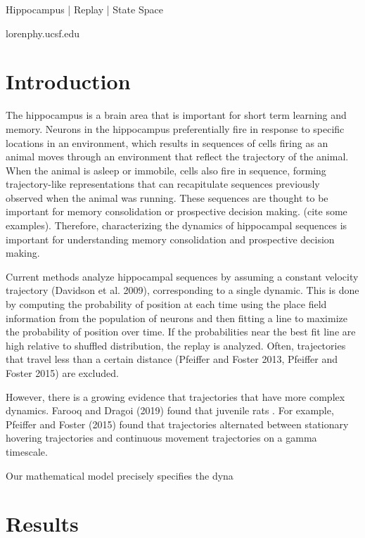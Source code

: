 \documentclass[times, twoside, watermark]{zHenriquesLab-StyleBioRxiv}
\begin{document}
\begin{keywords}
Hippocampus | Replay | State Space
\end{keywords}

\begin{corrauthor}
loren\at phy.ucsf.edu
\end{corrauthor}

\section*{Introduction}
The hippocampus is a brain area that is important for short term learning and memory. Neurons in the hippocampus preferentially fire in response to specific locations in an environment, which results in sequences of cells firing as an animal moves through an environment that reflect the trajectory of the animal. When the animal is asleep or immobile, cells also fire in sequence, forming trajectory-like representations that can recapitulate sequences previously observed when the animal was running. These sequences are thought to be important for memory consolidation or prospective decision making. (cite some examples). Therefore, characterizing the dynamics of hippocampal sequences is important for understanding memory consolidation and prospective decision making.

Current methods analyze hippocampal sequences by assuming a constant velocity trajectory (Davidson et al. 2009), corresponding to a single dynamic. This is done by computing the probability of position at each time using the place field information from the population of neurons and then fitting a line to maximize the probability of position over time. If the probabilities near the best fit line are high relative to shuffled distribution, the replay is analyzed. Often, trajectories that travel less than a certain distance (Pfeiffer and Foster 2013, Pfeiffer and Foster 2015) are excluded.

However, there is a growing evidence that trajectories that have more complex dynamics. Farooq and Dragoi (2019) found that juvenile rats . For example, Pfeiffer and Foster (2015) found that trajectories alternated between stationary hovering trajectories and continuous movement trajectories on a gamma timescale. 

Our mathematical model precisely specifies the dyna

\section*{Results}
\end{document}
